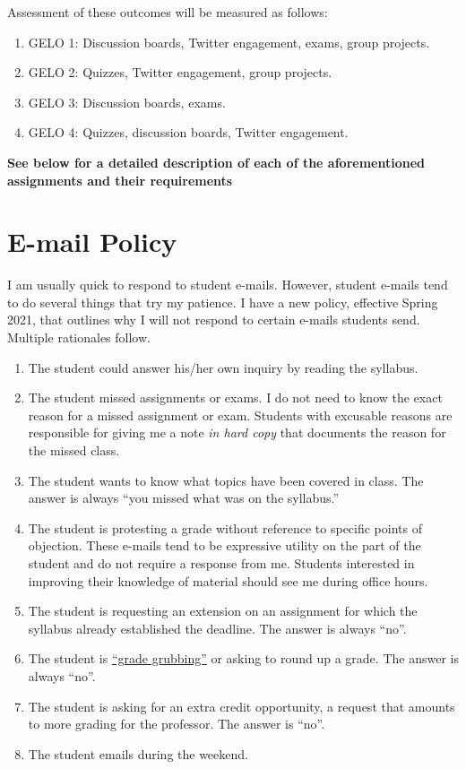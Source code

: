\documentclass[11pt,]{article}
\providecommand{\tightlist}{%
  \setlength{\itemsep}{0pt}\setlength{\parskip}{0pt}}
\begin{document}
Assessment of these outcomes will be measured as follows:

\begin{enumerate}
\def\labelenumi{\arabic{enumi}.}
\tightlist
\item
  GELO 1: Discussion boards, Twitter engagement, exams, group projects.
\item
  GELO 2: Quizzes, Twitter engagement, group projects.
\item
  GELO 3: Discussion boards, exams.
\item
  GELO 4: Quizzes, discussion boards, Twitter engagement.
\end{enumerate}

\textbf{See below for a detailed description of each of the
aforementioned assignments and their requirements}

\hypertarget{e-mail-policy}{%
\section{E-mail Policy}\label{e-mail-policy}}

I am usually quick to respond to student e-mails. However, student
e-mails tend to do several things that try my patience. I have a new
policy, effective Spring 2021, that outlines why I will not respond to
certain e-mails students send. Multiple rationales follow.

\begin{enumerate}
\def\labelenumi{\arabic{enumi}.}
\tightlist
\item
  The student could answer his/her own inquiry by reading the syllabus.
\item
  The student missed assignments or exams. I do not need to know the
  exact reason for a missed assignment or exam. Students with excusable
  reasons are responsible for giving me a note \emph{in hard copy} that
  documents the reason for the missed class.
\item
  The student wants to know what topics have been covered in class. The
  answer is always ``you missed what was on the syllabus.''
\item
  The student is protesting a grade without reference to specific points
  of objection. These e-mails tend to be expressive utility on the part
  of the student and do not require a response from me. Students
  interested in improving their knowledge of material should see me
  during office hours.
\item
  The student is requesting an extension on an assignment for which the
  syllabus already established the deadline. The answer is always
  ``no''.
\item
  The student is
  \href{https://www.math.uh.edu/~tomforde/GradeGrubbing.html}{``grade
  grubbing''} or asking to round up a grade. The answer is always
  ``no''.
\item
  The student is asking for an extra credit opportunity, a request that
  amounts to more grading for the professor. The answer is ``no''.
\item
  The student emails during the weekend.
\end{enumerate}
\end{document}
